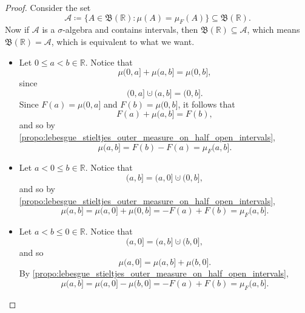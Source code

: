 \documentclass[notoc,notitlepage]{tufte-book}
\begin{document}
\begin{proof}
  \noindent
  Consider the set
  \begin{equation*}
    \mathcal{A} \coloneqq \{ A \in \mathfrak{B}(\mathbb{R})
          : \mu(A) = \mu_F(A) \} \subseteq \mathfrak{B}(\mathbb{R}).
  \end{equation*}
  Now if $\mathcal{A}$ is a $\sigma$-algebra and contains intervals,
  then $\mathfrak{B}(\mathbb{R}) \subseteq \mathcal{A}$,
  which means $\mathfrak{B}(\mathbb{R}) = \mathcal{A}$,
  which is equivalent to what we want.

  \noindent
  \begin{itemize}
    \item Let $0 \leq a < b \in \mathbb{R}$. Notice that
      \begin{equation*}
        \mu(0, a] + \mu(a, b] = \mu(0, b],
      \end{equation*}
      since
      \begin{equation*}
        (0, a] \cupdot (a, b] = (0, b].
      \end{equation*}
      Since $F(a) = \mu(0, a]$ and $F(b) = \mu(0, b]$,
      it follows that
      \begin{equation*}
        F(a) + \mu(a, b] = F(b),
      \end{equation*}
      and so by
      \cref{propo:lebesgue_stieltjes_outer_measure_on_half_open_intervals},
      \begin{equation*}
        \mu(a, b] = F(b) - F(a) = \mu_F(a, b].
      \end{equation*}

    \item Let $a < 0 \leq b \in \mathbb{R}$. Notice that
      \begin{equation*}
        (a, b] = (a, 0] \cupdot (0, b],
      \end{equation*}
      and so by
      \cref{propo:lebesgue_stieltjes_outer_measure_on_half_open_intervals},
      \begin{equation*}
        \mu(a, b] = \mu(a, 0] + \mu(0, b] = - F(a) + F(b) = \mu_F(a, b].
      \end{equation*}

    \item Let $a < b \leq 0 \in \mathbb{R}$. Notice that
      \begin{equation*}
        (a, 0] = (a, b] \cupdot (b, 0],
      \end{equation*}
      and so
      \begin{equation*}
        \mu(a, 0] = \mu(a, b] + \mu(b, 0].
      \end{equation*}
      By \cref{propo:lebesgue_stieltjes_outer_measure_on_half_open_intervals},
      \begin{equation*}
        \mu(a, b] = \mu(a, 0] - \mu(b, 0] = - F(a) + F(b) = \mu_F(a, b].
      \end{equation*}
  \end{itemize}


\end{proof}
\end{document}
